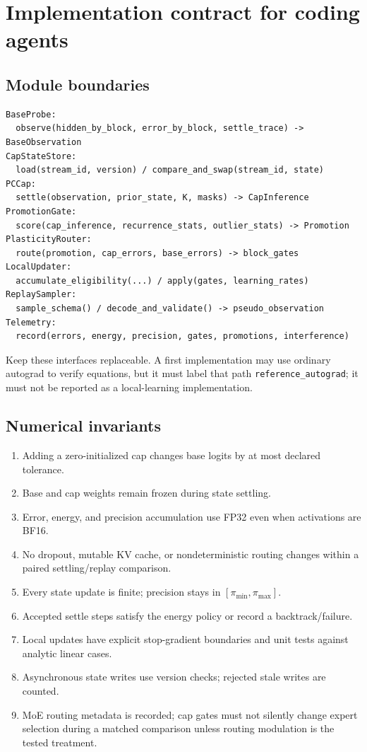 \documentclass[10pt]{article}
\newcommand{\gate}[1]{\texttt{#1}}
\begin{document}
\section{Implementation contract for coding agents}
\subsection{Module boundaries}
\begin{verbatim}
BaseProbe:
  observe(hidden_by_block, error_by_block, settle_trace) -> BaseObservation
CapStateStore:
  load(stream_id, version) / compare_and_swap(stream_id, state)
PCCap:
  settle(observation, prior_state, K, masks) -> CapInference
PromotionGate:
  score(cap_inference, recurrence_stats, outlier_stats) -> Promotion
PlasticityRouter:
  route(promotion, cap_errors, base_errors) -> block_gates
LocalUpdater:
  accumulate_eligibility(...) / apply(gates, learning_rates)
ReplaySampler:
  sample_schema() / decode_and_validate() -> pseudo_observation
Telemetry:
  record(errors, energy, precision, gates, promotions, interference)
\end{verbatim}
Keep these interfaces replaceable.  A first implementation may use ordinary autograd to
verify equations, but it must label that path \gate{reference\_autograd}; it must not be
reported as a local-learning implementation.

\subsection{Numerical invariants}
\begin{enumerate}
  \item Adding a zero-initialized cap changes base logits by at most declared tolerance.
  \item Base and cap weights remain frozen during state settling.
  \item Error, energy, and precision accumulation use FP32 even when activations are BF16.
  \item No dropout, mutable KV cache, or nondeterministic routing changes within a paired
  settling/replay comparison.
  \item Every state update is finite; precision stays in $[\pi_{\min},\pi_{\max}]$.
  \item Accepted settle steps satisfy the energy policy or record a backtrack/failure.
  \item Local updates have explicit stop-gradient boundaries and unit tests against analytic
  linear cases.
  \item Asynchronous state writes use version checks; rejected stale writes are counted.
  \item MoE routing metadata is recorded; cap gates must not silently change expert selection
  during a matched comparison unless routing modulation is the tested treatment.
\end{enumerate}
\end{document}
